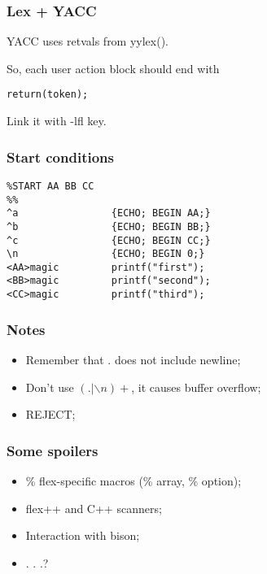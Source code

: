 \documentclass[14pt]{beamer}
\begin{document}
\begin{frame}[fragile]
	
	\frametitle{Lex + YACC}	
	
	YACC uses retvals from yylex().
	
	So, each user action block should end with
	
	\begin{lstlisting}
return(token);
	\end{lstlisting}
	
	Link it with -lfl key.
	
\end{frame}

\begin{frame}[fragile]
	
	\frametitle{Start conditions}	
	
	\begin{lstlisting}
%START AA BB CC
%%
^a                {ECHO; BEGIN AA;}
^b                {ECHO; BEGIN BB;}
^c                {ECHO; BEGIN CC;}
\n                {ECHO; BEGIN 0;}
<AA>magic         printf("first");
<BB>magic         printf("second");
<CC>magic         printf("third");
	\end{lstlisting}

\end{frame}

\begin{frame}[fragile]
	
	\frametitle{Notes}	
	
	\begin{itemize}
		\item Remember that . does not include newline;
		\item Don't use $(.|\backslash n)+$, it causes buffer overflow;
		\item REJECT; 
	\end{itemize}
	
\end{frame}

\begin{frame}[fragile]
	
	\frametitle{Some spoilers}	
	
	\begin{itemize}
		\item \% flex-specific macros (\% array, \% option);
		\item flex++ and C++ scanners;
		\item Interaction with bison;
		\item . . .?
	\end{itemize}
	
\end{frame}


	
	\begin{frame}
	\end{frame}
	
\end{document}
